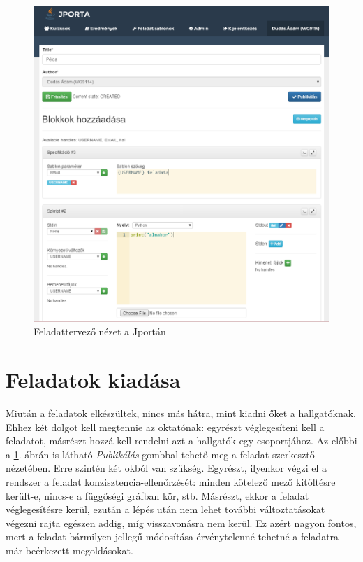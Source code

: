 \begin{figure}[h]
    \centering
    \includegraphics[width=\textwidth]{figures/jporta-exercise}
    \caption{Feladattervező nézet a Jportán}
    \label{figure:jporta-exercise}
\end{figure}

\section{Feladatok kiadása}
Miután a feladatok elkészültek, nincs más hátra, mint kiadni őket a hallgatóknak.
Ehhez két dolgot kell megtennie az oktatónak: egyrészt véglegesíteni kell a feladatot, másrészt hozzá kell rendelni azt a hallgatók egy csoportjához.
Az előbbi a \ref{figure:jporta-exercise}. ábrán is látható \textit{Publikálás} gombbal tehető meg a feladat szerkesztő nézetében.
Erre szintén két okból van szükség.
Egyrészt, ilyenkor végzi el a rendszer a feladat konzisztencia-ellenőrzését: minden kötelező mező kitöltésre került-e, nincs-e a függőségi gráfban kör, stb.
Másrészt, ekkor a feladat véglegesítésre kerül, ezután a lépés után nem lehet további változtatásokat végezni rajta egészen addig, míg visszavonásra nem kerül.
Ez azért nagyon fontos, mert a feladat bármilyen jellegű módosítása érvénytelenné tehetné a feladatra már beérkezett megoldásokat.

